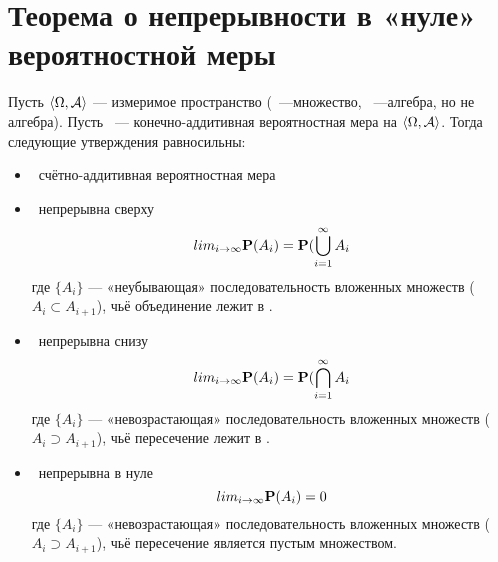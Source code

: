 \section{Теорема о непрерывности в «нуле» вероятностной меры}

\begin{theorem}
	Пусть $\langle \Omega, \mathcal{A} \rangle$ --- измеримое пространство (\oO~---множество, \Alg~---алгебра, но не \gm алгебра). Пусть \PP~--- конечно-аддитивная вероятностная мера на $\langle \Omega, \mathcal{A} \rangle$. Тогда следующие утверждения равносильны:
	\begin{itemize}
		\item \PP~счётно-аддитивная вероятностная мера
		\item \PP~непрерывна сверху
			$$lim_{i\rightarrow\infty}\mathbf{P}(A_i)=\mathbf{P}(\bigcup_{i=1}^\infty A_i$$
			где $\{A_i\}$ --- «неубывающая» последовательность вложенных множеств ($A_i \subset A_{i+1}$), чьё объединение лежит в \Alg.
		\item \PP~непрерывна снизу
			$$lim_{i\rightarrow\infty}\mathbf{P}(A_i)=\mathbf{P}(\bigcap_{i=1}^\infty A_i$$
			где $\{A_i\}$ --- «невозрастающая» последовательность вложенных множеств ($A_i \supset A_{i+1}$), чьё пересечение лежит в \Alg.
		\item \PP~непрерывна в нуле
			$$lim_{i\rightarrow\infty}\mathbf{P}(A_i)=0$$
			где $\{A_i\}$ --- «невозрастающая» последовательность вложенных множеств ($A_i \supset A_{i+1}$), чьё пересечение является пустым множеством.
	\end{itemize}
\end{theorem}